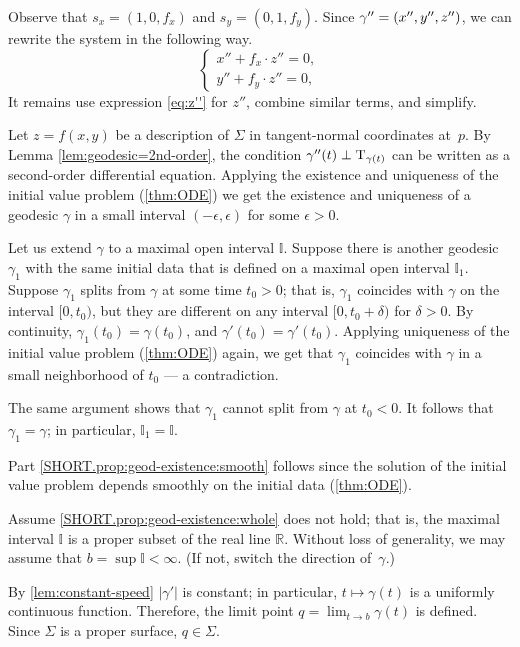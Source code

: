 Observe that 
$s_x=(1,0, f_x)$ 
and 
$s_y=(0,1, f_y)$.
Since $\gamma''\z=(x'',y'',z'')$, we can rewrite the system in the following way.
\[
\begin{cases}
x''+ f_x\cdot z''=0,
\\
y''+ f_y\cdot z''=0,
\end{cases}
\]
It remains use expression \ref{eq:z''} for $z''$, combine similar terms, and simplify.
\qeds


Let $z=f(x,y)$ be a description of $\Sigma$ in tangent-normal coordinates at~$p$.
By Lemma \ref{lem:geodesic=2nd-order}, the condition $\gamma''(t)\perp\mathrm{T}_{\gamma(t)}$ can be written as a second-order differential equation.
Applying the existence and uniqueness of the initial value problem (\ref{thm:ODE}) we get the existence and uniqueness of a geodesic $\gamma$ in a small interval $(-\epsilon,\epsilon)$ for some $\epsilon>0$.

Let us extend $\gamma$ to a maximal open interval $\mathbb{I}$.
Suppose there is another geodesic $\gamma_1$ with the same initial data that is defined on a maximal open interval $\mathbb{I}_1$.
Suppose $\gamma_1$ splits from $\gamma$ at some time $t_0>0$;
that is, $\gamma_1$ coincides with $\gamma$ on the interval $[0,t_0)$, but they are different on any interval $[0,t_0+\delta)$ for $\delta>0$.
By continuity, $\gamma_1(t_0)=\gamma(t_0)$, and $\gamma'(t_0)=\gamma'(t_0)$.
Applying uniqueness of the initial value problem (\ref{thm:ODE}) again, we get that $\gamma_1$ coincides with $\gamma$ in a small neighborhood of $t_0$ --- a contradiction.

The same argument shows that $\gamma_1$ cannot split from $\gamma$ at $t_0<0$.
It follows that $\gamma_1=\gamma$;
in particular, $\mathbb{I}_1=\mathbb{I}$.

Part \ref{SHORT.prop:geod-existence:smooth} follows since the solution of the initial value problem depends smoothly on the initial data (\ref{thm:ODE}).

Assume \ref{SHORT.prop:geod-existence:whole} does not hold;
that is, the maximal interval $\mathbb{I}$ is a proper subset of the real line $\mathbb{R}$.
Without loss of generality, we may assume that $b=\sup\mathbb{I}<\infty$.
(If not, switch the direction of~$\gamma$.)

By \ref{lem:constant-speed} $|\gamma'|$ is constant; in particular, $t\mapsto \gamma(t)$ is a uniformly continuous function.
Therefore, the limit point
$q=\lim_{t\to b}\gamma(t)$
is defined.
Since $\Sigma$ is a proper surface, $q\in \Sigma$. 


